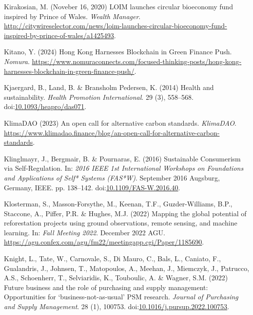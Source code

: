 \documentclass[
  letterpaper,
  DIV=11,
  numbers=noendperiod]{scrartcl}
\newlength{\cslhangindent}
\newenvironment{CSLReferences}[2] %
 {\begin{list}{}{%
  \setlength{\itemindent}{0pt}
  \setlength{\leftmargin}{0pt}
  \setlength{\parsep}{0pt}
  \ifodd #1
   \setlength{\leftmargin}{\cslhangindent}
   \setlength{\itemindent}{-1\cslhangindent}
  \fi
  \setlength{\itemsep}{#2\baselineskip}}}
 {\end{list}}
\begin{document}
\begin{CSLReferences}{0}{1}
Kirakosian, M. (Noveber 16, 2020) {LOIM} launches circular bioeconomy
fund inspired by {Prince} of {Wales}. \emph{Wealth Manager}.
\url{http://citywireselector.com/news/loim-launches-circular-bioeconomy-fund-inspired-by-prince-of-wales/a1425493}.

Kitano, Y. (2024) Hong {Kong Harnesses Blockchain} in {Green Finance
Push}. \emph{Nomura}.
\url{https://www.nomuraconnects.com/focused-thinking-posts/hong-kong-harnesses-blockchain-in-green-finance-push/}.

Kjaergard, B., Land, B. \& Bransholm Pedersen, K. (2014) Health and
sustainability. \emph{Health Promotion International}. 29 (3), 558--568.
doi:\href{https://doi.org/10.1093/heapro/das071}{10.1093/heapro/das071}.

KlimaDAO (2023) An open call for alternative carbon standards.
\emph{KlimaDAO}.
\url{https://www.klimadao.finance/blog/an-open-call-for-alternative-carbon-standards}.

Klinglmayr, J., Bergmair, B. \& Pournaras, E. (2016) Sustainable
{Consumerism} via {Self-Regulation}. In: \emph{2016 {IEEE} 1st
{International Workshops} on {Foundations} and {Applications} of {Self}*
{Systems} ({FAS}*{W})}. September 2016 Augsburg, Germany, IEEE. pp.
138--142.
doi:\href{https://doi.org/10.1109/FAS-W.2016.40}{10.1109/FAS-W.2016.40}.

Klosterman, S., Masson-Forsythe, M., Keenan, T.F., Guzder-Williams,
B.P., Staccone, A., Piffer, P.R. \& Hughes, M.J. (2022) Mapping the
global potential of reforestation projects using ground observations,
remote sensing, and machine learning. In: \emph{Fall {Meeting} 2022}.
December 2022 AGU.
\url{https://agu.confex.com/agu/fm22/meetingapp.cgi/Paper/1185690}.

Knight, L., Tate, W., Carnovale, S., Di Mauro, C., Bals, L., Caniato,
F., Gualandris, J., Johnsen, T., Matopoulos, A., Meehan, J., Miemczyk,
J., Patrucco, A.S., Schoenherr, T., Selviaridis, K., Touboulic, A. \&
Wagner, S.M. (2022) Future business and the role of purchasing and
supply management: {Opportunities} for {`business-not-as-usual'} {PSM}
research. \emph{Journal of Purchasing and Supply Management}. 28 (1),
100753.
doi:\href{https://doi.org/10.1016/j.pursup.2022.100753}{10.1016/j.pursup.2022.100753}.


\end{CSLReferences}
\end{document}
